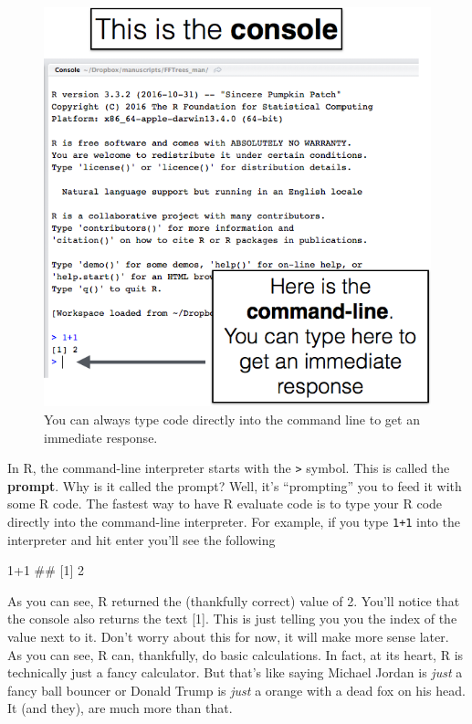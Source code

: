 \documentclass[]{book}
\newenvironment{Shaded}{\begin{snugshade}}{\end{snugshade}}
\newcommand{\DecValTok}[1]{\textcolor[rgb]{0.00,0.00,0.81}{{#1}}}
\newcommand{\NormalTok}[1]{{#1}}
\theoremstyle{definition}
\theoremstyle{definition}
\theoremstyle{remark}
\begin{document}
\begin{figure}

{\centering \includegraphics[width=0.75\linewidth]{images/commandline} 

}

\caption{You can always type code directly into the command line to get an immediate response.}\label{fig:unnamed-chunk-53}
\end{figure}

In R, the command-line interpreter starts with the
\texttt{\textgreater{}} symbol. This is called the \textbf{prompt}. Why
is it called the prompt? Well, it's ``prompting'' you to feed it with
some R code. The fastest way to have R evaluate code is to type your R
code directly into the command-line interpreter. For example, if you
type \texttt{1+1} into the interpreter and hit enter you'll see the
following

\begin{Shaded}
\begin{Highlighting}[]
\DecValTok{1+1}
\NormalTok{## [1] 2}
\end{Highlighting}
\end{Shaded}

As you can see, R returned the (thankfully correct) value of 2. You'll
notice that the console also returns the text {[}1{]}. This is just
telling you you the index of the value next to it. Don't worry about
this for now, it will make more sense later. As you can see, R can,
thankfully, do basic calculations. In fact, at its heart, R is
technically just a fancy calculator. But that's like saying Michael
Jordan is \emph{just} a fancy ball bouncer or Donald Trump is
\emph{just} a orange with a dead fox on his head. It (and they), are
much more than that.
\end{document}
